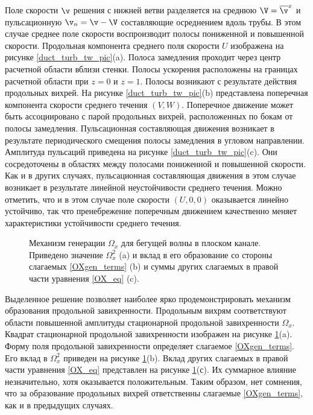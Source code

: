 Поле скорости $\v$ решения с нижней ветви разделяется на среднюю $\V = \overline{\v}^x$ и пульсационную $\v_n = \v - \V$ составляющие осреднением вдоль трубы. В этом случае среднее поле скорости воспроизводит полосы пониженной и повышенной скорости. Продольная компонента среднего поля скорости $U$ изображена на рисунке \ref{duct_turb_tw_pic}(a). Полоса замедления проходит через центр расчетной области вблизи стенки. Полосы ускорения расположены на границах расчетной области при $z = 0$ и $z = 1$. Полосы возникают с результате действия продольных вихрей. На рисунке \ref{duct_turb_tw_pic}(b) представлена поперечная компонента скорости среднего течения $(V,W)$. Поперечное движение может быть ассоциировано с парой продольных вихрей, расположенных по бокам от полосы замедления. Пульсационная составляющая движения возникает в результате периодического смещения полосы замедления в угловом направлении. Амплитуда пульсаций приведена на рисунке \ref{duct_turb_tw_pic}(c). Они сосредоточены в областях между полосами пониженной и повышенной скорости. Как и в других случаях, пульсационная составляющая движения в этом случае возникает в результате линейной неустойчивости среднего течения. Можно отметить, что и в этом случае поле скорости $(U,0,0)$ оказывается линейно устойчиво, так что пренебрежение поперечным движением качественно меняет характеристики устойчивости среднего течения. 

\begin{figure}
\caption{Механизм генерации $\Omega_x$ для бегущей волны в плоском канале. Приведено значение $\Omega_x^2$ (a) и вклад в его образование со стороны слагаемых \eqref{OXgen_terms} (b) и суммы других слагаемых в правой части уравнения \eqref{OX_eq} (c).} 
\label{duct_turb_tw_OXgen_pic}
\end{figure}

Выделенное решение позволяет наиболее ярко продемонстрировать механизм образования продольной завихренности. Продольным вихрям соответствуют области повышенной амплитуды стационарной продольной завихренности $\Omega_x$. Квадрат стационарной продольной завихренности изображен на рисунке \ref{duct_turb_tw_OXgen_pic}(a). Форму поля продольной завихренности определяет слагаемое \eqref{OXgen_terms}. Его вклад в $\Omega_x^2$ приведен на рисунке \ref{duct_turb_tw_OXgen_pic}(b). Вклад других слагаемых в правой части уравнения \eqref{OX_eq} представлен на рисунке \ref{duct_turb_tw_OXgen_pic}(с). Их суммарное влияние незначительно, хотя оказывается положительным. Таким образом, нет сомнения, что за образование продольных вихрей ответственны слагаемые \eqref{OXgen_terms}, как и в предыдущих случаях. 

